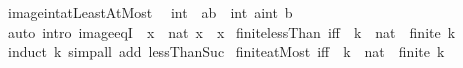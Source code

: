 \begin{isabellebody}
\endisatagproof
{\isafoldproof}%
%
\isadelimproof
\isanewline
%
\endisadelimproof
\isanewline
{}\isamarkupfalse%
\ image{\isacharunderscore}{\kern0pt}int{\isacharunderscore}{\kern0pt}atLeastAtMost{\isacharcolon}{\kern0pt}\isanewline
\ \ {\isachardoublequoteopen}int\ {\isacharbackquote}{\kern0pt}\ {\isacharbraceleft}{\kern0pt}a{\isachardot}{\kern0pt}{\isachardot}{\kern0pt}b{\isacharbraceright}{\kern0pt}\ {\isacharequal}{\kern0pt}\ {\isacharbraceleft}{\kern0pt}int\ a{\isachardot}{\kern0pt}{\isachardot}{\kern0pt}int\ b{\isacharbraceright}{\kern0pt}{\isachardoublequoteclose}\isanewline
%
\isadelimproof
\ \ %
\endisadelimproof
%
\isatagproof
{}\isamarkupfalse%
\ {\isacharparenleft}{\kern0pt}auto\ intro{\isacharbang}{\kern0pt}{\isacharcolon}{\kern0pt}\ image{\isacharunderscore}{\kern0pt}eqI\ {\isacharbrackleft}{\kern0pt}\ x\ {\isacharequal}{\kern0pt}\ {\isachardoublequoteopen}nat\ x{\isachardoublequoteclose}\ \ x{\isacharbrackright}{\kern0pt}{\isacharparenright}{\kern0pt}%
\endisatagproof
{\isafoldproof}%
%
\isadelimproof
%
\endisadelimproof
%
\isadelimdocument
%
\endisadelimdocument
%
\isatagdocument
%
\isamarkuptrue%
%
\endisatagdocument
{\isafolddocument}%
%
\isadelimdocument
%
\endisadelimdocument
{}\isamarkupfalse%
\ finite{\isacharunderscore}{\kern0pt}lessThan\ {\isacharbrackleft}{\kern0pt}iff{\isacharbrackright}{\kern0pt}{\isacharcolon}{\kern0pt}\ \ k\ {\isacharcolon}{\kern0pt}{\isacharcolon}{\kern0pt}\ nat\ \ {\isachardoublequoteopen}finite\ {\isacharbraceleft}{\kern0pt}{\isachardot}{\kern0pt}{\isachardot}{\kern0pt}{\isacharless}{\kern0pt}k{\isacharbraceright}{\kern0pt}{\isachardoublequoteclose}\isanewline
%
\isadelimproof
\ \ %
\endisadelimproof
%
\isatagproof
{}\isamarkupfalse%
\ {\isacharparenleft}{\kern0pt}induct\ k{\isacharparenright}{\kern0pt}\ {\isacharparenleft}{\kern0pt}simp{\isacharunderscore}{\kern0pt}all\ add{\isacharcolon}{\kern0pt}\ lessThan{\isacharunderscore}{\kern0pt}Suc{\isacharparenright}{\kern0pt}%
\endisatagproof
{\isafoldproof}%
%
\isadelimproof
\isanewline
%
\endisadelimproof
\isanewline
{}\isamarkupfalse%
\ finite{\isacharunderscore}{\kern0pt}atMost\ {\isacharbrackleft}{\kern0pt}iff{\isacharbrackright}{\kern0pt}{\isacharcolon}{\kern0pt}\ \ k\ {\isacharcolon}{\kern0pt}{\isacharcolon}{\kern0pt}\ nat\ \ {\isachardoublequoteopen}finite\ {\isacharbraceleft}{\kern0pt}{\isachardot}{\kern0pt}{\isachardot}{\kern0pt}k{\isacharbraceright}{\kern0pt}{\isachardoublequoteclose}\isanewline

\end{isabellebody}
